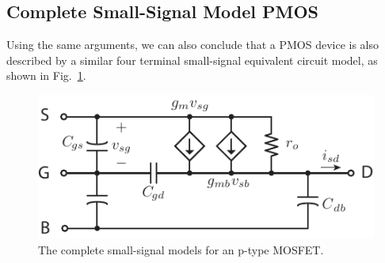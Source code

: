 \subsection{Complete Small-Signal Model PMOS}
Using the same arguments, we can also conclude that a PMOS device is also described by a similar four terminal small-signal equivalent circuit model, as shown in Fig.~\ref{fig:pmos4term_ac}.
\begin{figure}[h]
\centering
\includegraphics[scale=1]{pmos4term_ac}
\caption{The complete small-signal models for an p-type MOSFET.}
\label{fig:pmos4term_ac}
\end{figure}
